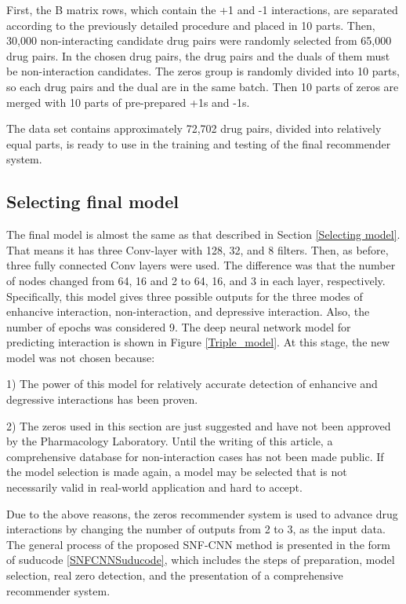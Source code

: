\documentclass{bmcart}
\begin{document}
First, the B matrix rows, which contain the +1 and -1 interactions, are separated according to the previously detailed procedure and placed in 10 parts. Then, 30,000 non-interacting candidate drug pairs were randomly selected from 65,000 drug pairs. In the chosen drug pairs, the drug pairs and the duals of them must be non-interaction candidates. The zeros group is randomly divided into 10 parts, so each drug pairs and the dual are in the same batch. Then 10 parts of zeros are merged with 10 parts of pre-prepared +1s and -1s. 

The data set contains approximately 72,702 drug pairs, divided into relatively equal parts, is ready to use in the training and testing of the final recommender system.

\subsection*{Selecting final model}
The final model is almost the same as that described in Section
\ref{Selecting model}. That means it has three Conv-layer with 128, 32, and 8 filters. Then, as before, three fully connected Conv layers were used. The difference was that the number of nodes changed from 64, 16 and 2 to 64, 16, and 3 in each layer, respectively. Specifically, this model gives three possible outputs for the three modes of enhancive interaction, non-interaction, and depressive interaction. Also, the number of epochs was considered 9. The deep neural network model for predicting interaction is shown in Figure
\ref{Triple_model}. At this stage, the new model was not chosen because:

1) The power of this model for relatively accurate detection of enhancive and degressive interactions has been proven.

2) The zeros used in this section are just suggested and have not been approved by the Pharmacology Laboratory. Until the writing of this article, a comprehensive database for non-interaction cases has not been made public. If the model selection is made again, a model may be selected that is not necessarily valid in real-world application and hard to accept.

Due to the above reasons, the zeros recommender system is used to advance drug interactions by changing the number of outputs from 2 to 3, as the input data. The general process of the proposed SNF-CNN method is presented in the form of suducode \ref{SNFCNNSuducode}, which includes the steps of preparation, model selection, real zero detection, and the presentation of a comprehensive recommender system. 
\end{document}
